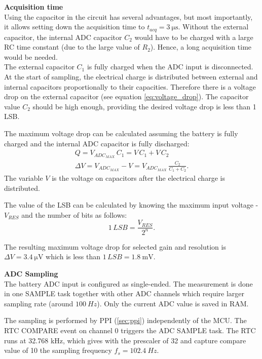         
        \textbf{Acquisition time}\\ 
        Using the capacitor in the circuit has several advantages, but most importantly, it allows setting down the acquisition time to $t_{acq} = \SI{3}{\micro\second}$. Without the external capacitor, the internal ADC capacitor $C_2$ would have to be charged with a large RC time constant (due to the large value of $R_2$). Hence, a long acquisition time would be needed.\\
        The external capacitor $C_1$ is fully charged when the ADC input is disconnected. At the start of sampling, the electrical charge is distributed between external and internal capacitors proportionally to their capacities. Therefore there is a voltage drop on the external capacitor (see equation \ref{eq:voltage_drop}). The capacitor value $C_2$ should be high enough, providing the desired voltage drop is less than 1 LSB.
        
        The maximum voltage drop can be calculated assuming the battery is fully charged and the internal ADC capacitor is fully discharged:
        \begin{align}
            Q = V_{ADC_{MAX}}\, C_1 = V \, C_1 + V \, C_2\\
            \Delta V = V_{ADC_{MAX}} - V = V_{ADC_{MAX}} \, \frac{C_2}{C_1 + C_2}. \label{eq:voltage_drop}
        \end{align}
        The variable $V$ is the voltage on capacitors after the electrical charge is distributed.
        
        The value of the LSB can be calculated by knowing the maximum input voltage - $V_{RES}$ and the number of bits as follows:
        \begin{equation}
            1 \, LSB = \frac{V_{RES}}{2^n}.
        \end{equation}
        
        The resulting maximum voltage drop for selected gain and resolution is $\Delta V = \SI{3.4}{\micro\volt}$ which is less than $1\, LSB = \SI{1.8}{\milli\volt}$.
    

    
        \textbf{ADC Sampling}\\
            The battery ADC input is configured as single-ended. The measurement is done in one SAMPLE task together with other ADC channels which require larger sampling rate (around $\SI{100}{Hz}$). Only the current ADC value is saved in RAM. 
            
            The sampling is performed by PPI (\ref{sec:ppi}) independently of the MCU. The RTC COMPARE event on channel 0 triggers the ADC SAMPLE task. The RTC runs at 32.768 kHz, which gives with the prescaler of 32 and capture compare value of 10 the sampling frequency $f_s = \SI{102.4}{Hz}$. 
            

